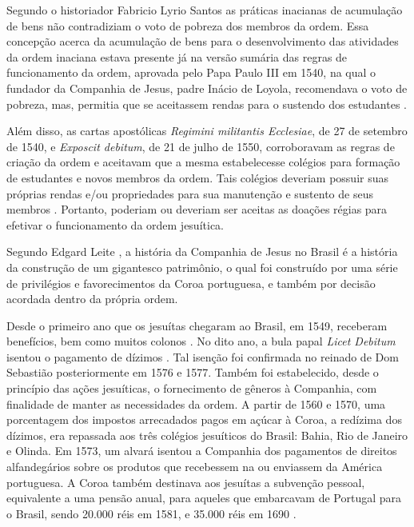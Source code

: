 \begin{refsection}
Segundo o historiador Fabricio Lyrio Santos \citeyear{Santos2008} as práticas inacianas de acumulação de bens não contradiziam o voto de pobreza dos membros da ordem. Essa concepção acerca da acumulação de bens para o desenvolvimento das atividades da ordem inaciana estava presente já na versão sumária das regras de funcionamento da ordem, aprovada pelo Papa Paulo III em 1540, na qual o fundador da Companhia de Jesus, padre Inácio de Loyola, recomendava o voto de pobreza, mas, permitia que se aceitassem rendas para o sustendo dos estudantes \cite{Santos2008}.  

Além disso, as cartas apostólicas \textit{Regimini militantis Ecclesiae}, de 27 de setembro de 1540, e \textit{Exposcit debitum}, de 21 de julho de 1550, corroboravam as regras de criação da ordem e aceitavam que a mesma estabelecesse colégios para formação de estudantes e novos membros da ordem. Tais colégios deveriam possuir suas próprias rendas e/ou propriedades para sua manutenção e sustento de seus membros \cite{Santos2008}. Portanto, poderiam ou deveriam ser aceitas as doações régias para efetivar o funcionamento da ordem jesuítica.  

Segundo Edgard Leite \citeyear[p.~60]{Leite2000}, a história da Companhia de Jesus no Brasil é a história da construção de um gigantesco patrimônio, o qual foi construído por uma série de privilégios e favorecimentos da Coroa portuguesa, e também por decisão acordada dentro da própria ordem. 

Desde o primeiro ano que os jesuítas chegaram ao Brasil, em 1549, receberam benefícios, bem como muitos colonos \cite[p.~30--71]{Fragoso2001}. No dito ano, a bula papal \textit{Licet Debitum} isentou o pagamento de dízimos \cite[Tombo~VII,~p.~103]{Leite2004}. Tal isenção foi confirmada no reinado de Dom Sebastião posteriormente em 1576 e 1577. Também foi estabelecido, desde o princípio das ações jesuíticas, o fornecimento de gêneros à Companhia, com finalidade de manter as necessidades da ordem. A partir de 1560 e 1570, uma porcentagem dos impostos arrecadados pagos em açúcar à Coroa, a redízima dos dízimos, era repassada aos três colégios jesuíticos do Brasil: Bahia, Rio de Janeiro e Olinda. Em 1573, um alvará isentou a Companhia dos pagamentos de direitos alfandegários sobre os produtos que recebessem na ou enviassem da América portuguesa. A Coroa também destinava aos jesuítas a subvenção pessoal, equivalente a uma pensão anual, para aqueles que embarcavam de Portugal para o Brasil, sendo 20.000 réis em 1581, e 35.000 réis em 1690 \cite[p.~60--61]{Leite2000}. 


\end{refsection}
